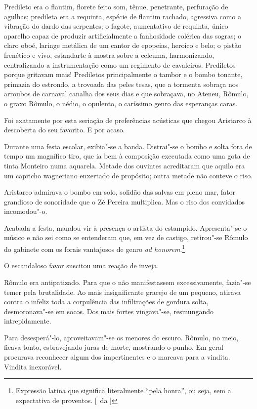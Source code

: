 Predileto era o flautim, florete feito som,
tênue, penetrante, perfuração de agulhas; predileta era a requinta,
espécie de flautim rachado, agressiva como a vibração do dardo das
serpentes; o fagote, aumentativo de requinta, único aparelho capaz de
produzir artificialmente a fanhosidade colérica das sogras; 
o claro oboé, laringe metálica de um cantor de epopeias, heroico
e belo; o pistão frenético e vivo, estandarte à mostra sobre a celeuma,
harmonizando, centralizando a instrumentação como um regimento de
cavaleiros. Prediletos porque gritavam mais! Prediletos principalmente
o tambor e o bombo tonante, primazia do estrondo, a trovoada das peles
tesas, que a tormenta sobraça nos arroubos de carnaval canalha dos seus
dias e que sobraçava, no Ateneu, Rômulo, o graxo Rômulo, o nédio, o
opulento, o caríssimo genro das esperanças caras. 

Foi exatamente por
esta seriação de preferências acústicas que chegou Aristarco à
descoberta do seu favorito. E por acaso. 

Durante uma festa escolar,
exibia"-se a banda. Distrai"-se o bombo e solta fora de tempo um
magnífico tiro, que ia bem à composição executada como uma gota de
tinta Monteiro numa aquarela. Metade dos ouvintes acreditaram que
aquilo era um capricho wagneriano enxertado de propósito; outra metade
não conteve o riso. 

Aristarco admirava o bombo em solo, solidão das
salvas em pleno mar, fator grandioso de sonoridade que o Zé Pereira
multiplica. Mas o riso dos convidados incomodou"-o. 

Acabada a festa,
mandou vir à presença o artista do estampido. Apresenta"-se o músico e
não sei como se entenderam que, em vez de castigo, retirou"-se Rômulo
do gabinete com os forais vantajosos de genro \textit{ad honorem}.\footnote{ Expressão latina que significa literalmente ``pela honra'', 
ou seja, sem a expectativa de proventos. [~da ]}

O escandaloso favor suscitou uma reação de inveja. 

Rômulo era antipatizado. 
Para que o não manifestassem excessivamente, fazia"-se temer pela brutalidade.
Ao mais insignificante gracejo de um pequeno, atirava contra o infeliz
toda a corpulência das infiltrações de gordura solta, desmoronava"-se
em socos. Dos mais fortes vingava"-se, resmungando intrepidamente.

Para desesperá"-lo, aproveitavam"-se os menores do escuro. Rômulo, no
meio, ficava tonto, esbravejando juras de morte, mostrando o punho. Em
geral procurava reconhecer algum dos impertinentes e o marcava para a
vindita. Vindita inexorável. 

